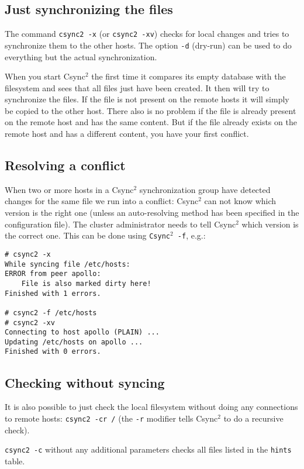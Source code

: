 \documentclass[a4paper,twocolumn]{article}
\def\csync2{{\sc Csync$^{2}$}}
\begin{document}
\subsection{Just synchronizing the files}

The command {\tt csync2 -x} (or {\tt csync2 -xv}) checks for local changes and
tries to synchronize them to the other hosts. The option {\tt -d} (dry-run) can
be used to do everything but the actual synchronization.

When you start \csync2 the first time it compares its empty database with the
filesystem and sees that all files just have been created. It then will try
to synchronize the files. If the file is not present on the remote hosts it
will simply be copied to the other host. There also is no problem if the file
is already present on the remote host and has the same content. But if the
file already exists on the remote host and has a different content, you
have your first conflict.

\subsection{Resolving a conflict}

When two or more hosts in a \csync2 synchronization group have detected changes
for the same file we run into a conflict: \csync2 can not know which version is
the right one (unless an auto-resolving method has been specified in the
configuration file). The cluster administrator needs to tell \csync2 which
version is the correct one. This can be done using {\tt \csync2 -f}, e.g.:

\begin{verbatim}
# csync2 -x
While syncing file /etc/hosts:
ERROR from peer apollo:
    File is also marked dirty here!
Finished with 1 errors.

# csync2 -f /etc/hosts
# csync2 -xv
Connecting to host apollo (PLAIN) ...
Updating /etc/hosts on apollo ...
Finished with 0 errors.
\end{verbatim}

\subsection{Checking without syncing}

It is also possible to just check the local filesystem without doing any
connections to remote hosts: {\tt csync2 -cr /} (the {\tt -r} modifier
tells \csync2 to do a recursive check).

{\tt csync2 -c} without any additional parameters checks all files listed
in the {\tt hints} table.
\end{document}
